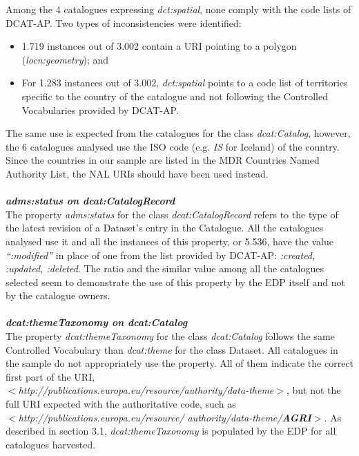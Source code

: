 \documentclass[<options>]{elsarticle}
\begin{document}
Among the 4 catalogues expressing \textit{dct:spatial}, none comply with the code lists of DCAT-AP. Two types of inconsistencies were identified:
\begin{itemize}
\item 1.719 instances out of 3.002 contain a URI pointing to a polygon (\textit{locn:geometry}); and
\item For 1.283 instances out of 3.002, \textit{dct:spatial} points to a code list of territories specific to the country of the catalogue and not following the Controlled Vocabularies provided by DCAT-AP.
% 
% 
\end{itemize}

The same use is expected from the catalogues for the class \textit{dcat:Catalog}, however, the 6 catalogues analysed use the ISO code (e.g. \textit{IS} for Iceland) of the country.  Since the countries in our sample are listed in the MDR Countries Named Authority List, the NAL URIs should have been used instead.
\\
\\
\textbf{\textit{adms:status on dcat:CatalogRecord}}\\
The property \textit{adms:status }for the class \textit{dcat:CatalogRecord} refers to the type of the latest revision of a Dataset's entry in the Catalogue. All the catalogues analysed use it and all the instances of this property, or 5.536, have the value \textit{“:modified”} in place of one from the list provided by DCAT-AP: \textit{:created, :updated, :deleted}. The ratio and the similar value among all the catalogues selected seem to demonstrate the use of this property by the EDP itself and not by the catalogue owners.
\\
\\
\textbf{\textit{dcat:themeTaxonomy on dcat:Catalog}}\\
The property \textit{dcat:themeTaxonomy} for the class \textit{dcat:Catalog} follows the same Controlled Vocabulary than \textit{dcat:theme} for the class Dataset. All catalogues in the sample do not appropriately use the property. All of them indicate the correct first part of the URI, \\
\textit{$<$http://publications.europa.eu/resource/authority/data-theme$>$}, but not the full URI expected with the authoritative code, such as \\ \textit{$<$http://publications.europa.eu/resource/ authority/data-theme/\textbf{AGRI}$>$}. As described in section 3.1, \textit{dcat:themeTaxonomy} is populated by the EDP for all catalogues harvested.
\end{document}
